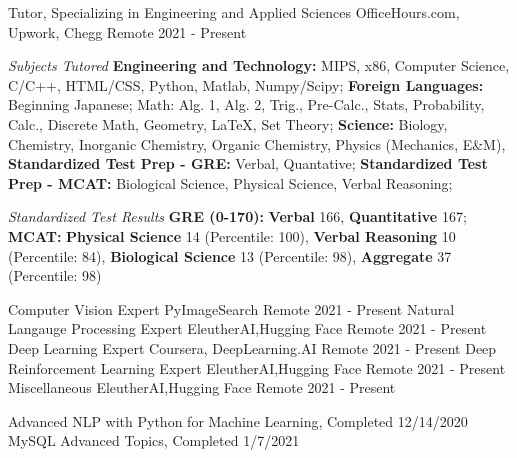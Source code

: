 \begin{cventries}
    \cventry
        {Tutor, Specializing in Engineering and Applied Sciences}
        {OfficeHours.com, Upwork, Chegg}
        {Remote}
        {2021 - Present}
        {
            \begin{cvparagraph}
                \emph{Subjects Tutored} \textbf{Engineering and Technology:} MIPS, x86, Computer Science, C/C++, HTML/CSS, Python, Matlab, Numpy/Scipy; \textbf{Foreign Languages:} Beginning Japanese; Math: Alg. 1, Alg. 2, Trig., Pre-Calc., Stats, Probability, Calc., Discrete Math, Geometry, LaTeX, Set Theory; \textbf{Science:} Biology, Chemistry, Inorganic Chemistry, Organic Chemistry, Physics (Mechanics, E\&M), \textbf{Standardized Test Prep - GRE:} Verbal, Quantative; \textbf{Standardized Test Prep - MCAT:} Biological Science, Physical Science, Verbal Reasoning;
            \end{cvparagraph}
            \begin{cvparagraph}
                \emph{Standardized Test Results} \textbf{GRE (0-170):} \textbf{Verbal} 166, \textbf{Quantitative} 167; \textbf{MCAT:} \textbf{Physical Science} 14 (Percentile: 100), \textbf{Verbal Reasoning} 10 (Percentile: 84), \textbf{Biological Science} 13 (Percentile: 98), \textbf{Aggregate} 37 (Percentile: 98)
            \end{cvparagraph}
        }
    \cventry
        {Computer Vision Expert}
        {PyImageSearch}
        {Remote}
        {2021 - Present}
        {
        }
    \cventry
        {Natural Langauge Processing Expert}
        {EleutherAI,Hugging Face}
        {Remote}
        {2021 - Present}
        {
        }
    \cventry
        {Deep Learning Expert}
        {Coursera, DeepLearning.AI}
        {Remote}
        {2021 - Present}
        {
        }
    \cventry
        {Deep Reinforcement Learning Expert}
        {EleutherAI,Hugging Face}
        {Remote}
        {2021 - Present}
        {
        }
    \cventry
        {Miscellaneous}
        {EleutherAI,Hugging Face}
        {Remote}
        {2021 - Present}
        {
            Advanced NLP with Python for Machine Learning, Completed 12/14/2020
            MySQL Advanced Topics, Completed 1/7/2021

        }
\end{cventries}
\begin{comment}
    \begin{cvparagraph}
        \begin{center}
            \begin{tabular}{ | m{5em} | m{1cm}| m{1cm} | } 
                \hline
                cell1 dummy text dummy text dummy text& cell2 & cell3 \\ 
                \hline
                cell1 dummy text dummy text dummy text & cell5 & cell6 \\ 
                \hline
                cell7 & cell8 & cell9 \\ 
                \hline
            \end{tabular}
        \end{center}
    \end{cvparagraph}
\end{comment}
